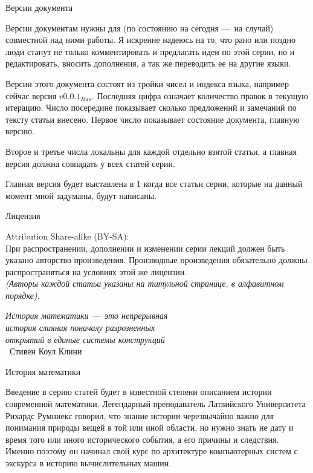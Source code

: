 \documentclass[math.tex]{subfiles}
\begin{document}
	\vspace{1cm}
	\LARGE{Версии документа}\\
	\normalsize
	
	Версии документам нужны для (по состоянию на сегодня —\ на случай) со\-вместной над ними работы.
Я искренне надеюсь на то, что рано или поздно люди станут не только комментировать и предлагать идеи по этой серии, но и редак\-тировать, вносить дополнения, а так же переводить ее на другие языки.
	
	Версии этого документа состоят из тройки чисел и индекса языка, например сейчас версия $v0.0.1_{Rus}$. 
Последняя цифра означает количество правок в текущую итерацию. 
Число посередине показывает сколько предложений и замечаний по тексту статьи внесено. 
Первое число показывает состояние документа, главную версию.

	Второе и третье числа локальны для каждой отдельно взятой статьи, а главная версия должна совпадать у всех статей серии.

	Главная версия будет выставлена в 1 когда все статьи серии, которые на данный момент мной задуманы, будут написаны.
	
	\vspace{1cm}
	\LARGE{Лицензия}\\
	\normalsize

	Attribution Share-alike (BY-SA):\\

	При распространении, дополнении и изменении серии лекций должен быть указано авторство про\-из\-ведения.
Производные произведения обязательно должны распространяться на условиях этой же лицензии.\\
	
	\emph{(Авторы каждой статьи указаны на титульной странице, в алфавитном порядке).}
	
	\vspace{1cm}
	\newpage
	\begin{flushright}
		\emph{История математики —\ это непрерывная\\ история слияния поначалу разрозненных\\ открытий в единые системы конструкций}\\
		~Стивен Коул Клини
	\end{flushright}
	\LARGE{История математики}
	\newline
	\normalsize
	
	Введение в серию статей будет в известной степени описанием истории современной математики.
Легендарный преподаватель Латвийского Университета Рихардс Румниекс говорил, что знание истории черезвычайно важно для понимания природы вещей в той или иной области, но нужно знать не дату и время того или иного исторического события, а его причины и следствия.
Именно поэтому он начинал свой курс по архитектуре компьютерных систем с экскурса в историю вычислительных машин.
\end{document}
